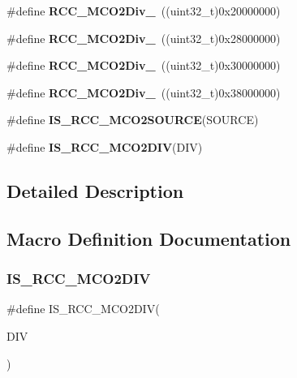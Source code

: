 \begin{DoxyCompactItemize}
\#define {\bfseries R\+C\+C\+\_\+\+M\+C\+O2\+Div\+\_}~((uint32\+\_\+t)0x20000000)
\item 
\mbox{\label{group___r_c_c___m_c_o2___clock___source___prescaler_gad94c96c38025e6a5164bc277d87173a6}} 
\#define {\bfseries R\+C\+C\+\_\+\+M\+C\+O2\+Div\+\_}~((uint32\+\_\+t)0x28000000)
\item 
\mbox{\label{group___r_c_c___m_c_o2___clock___source___prescaler_ga3ff14a7e8bb898eadf24d879ee41069f}} 
\#define {\bfseries R\+C\+C\+\_\+\+M\+C\+O2\+Div\+\_}~((uint32\+\_\+t)0x30000000)
\item 
\mbox{\label{group___r_c_c___m_c_o2___clock___source___prescaler_gac47804a0bf27b079a23dd532d5482cf9}} 
\#define {\bfseries R\+C\+C\+\_\+\+M\+C\+O2\+Div\+\_}~((uint32\+\_\+t)0x38000000)
\item 
\#define {\bfseries I\+S\+\_\+\+R\+C\+C\+\_\+\+M\+C\+O2\+S\+O\+U\+R\+CE}(S\+O\+U\+R\+CE)
\item 
\#define {\bfseries I\+S\+\_\+\+R\+C\+C\+\_\+\+M\+C\+O2\+D\+IV}(D\+IV)
\end{DoxyCompactItemize}


\subsection{Detailed Description}


\subsection{Macro Definition Documentation}
\mbox{\label{group___r_c_c___m_c_o2___clock___source___prescaler_gab28570d78a518bc83f82a96e7b0b8a73}} 
\subsubsection{\texorpdfstring{I\+S\+\_\+\+R\+C\+C\+\_\+\+M\+C\+O2\+D\+IV}{IS\_RCC\_MCO2DIV}}
{\footnotesize\ttfamily \#define I\+S\+\_\+\+R\+C\+C\+\_\+\+M\+C\+O2\+D\+IV(\begin{DoxyParamCaption}\item[{}]{D\+IV }\end{DoxyParamCaption})}

